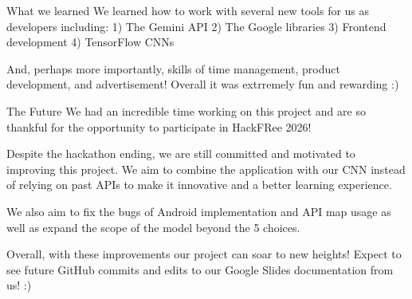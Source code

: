 What we learned
We learned how to work with several new tools for us as developers including: 1) The Gemini API 2) The Google libraries 3) Frontend development 4) TensorFlow CNNs

And, perhaps more importantly, skills of time management, product development, and advertisement! Overall it was extrremely fun and rewarding :)

The Future
We had an incredible time working on this project and are so thankful for the opportunity to participate in HackFRee 2026!

Despite the hackathon ending, we are still committed and motivated to improving this project. We aim to combine the application with our CNN instead of relying on past APIs to make it innovative and a better learning experience.

We also aim to fix the bugs of Android implementation and API map usage as well as expand the scope of the model beyond the 5 choices.

Overall, with these improvements our project can soar to new heights! Expect to see future GitHub commits and edits to our Google Slides documentation from us! :)
